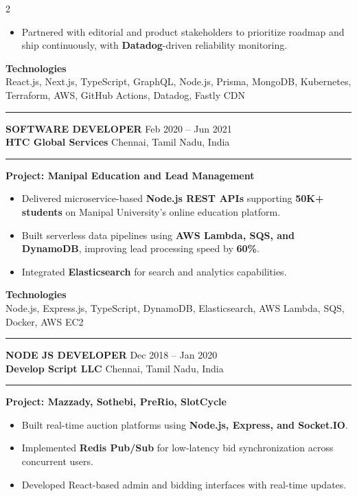 \documentclass[10pt,a4paper]{article}
\newcommand{\blockdivider}{\vspace{0pt}\color{rulecolor}\rule{\linewidth}{0.5pt}\color{primary}\vspace{4pt}}
\newcommand{\roleheader}[4]{%
  \noindent
  \textbf{\MakeUppercase{#3}}%
  \hfill
  \textcolor{secondary}{#4}\\[0pt]

  \noindent
  \textbf{#1}%
  \hfill
  \textcolor{secondary}{#2}\\[0pt]
}
\newcommand{\roledivider}{%
  \vspace{-1pt}%
  {\color{rulecolor}\rule{\linewidth}{0.5pt}}%
  \vspace{2pt}%
}
\newcommand{\projecttitle}[1]{\textbf{#1}\par\vspace{2pt}}
\begin{document}
\begin{paracol}{2}
\begin{itemize}
\item Partnered with editorial and product stakeholders to prioritize roadmap and ship continuously, with \textbf{Datadog}-driven reliability monitoring.

\end{itemize}

\textbf{Technologies}\\
React.js, Next.js, TypeScript, GraphQL, Node.js, Prisma, MongoDB, Kubernetes, Terraform, AWS, GitHub Actions, Datadog, Fastly CDN

\blockdivider

\roleheader{HTC Global Services}{Chennai, Tamil Nadu, India}{Software Developer}{Feb 2020 -- Jun 2021}
\roledivider

\projecttitle{Project: Manipal Education and Lead Management}
\begin{itemize}

\item Delivered microservice-based \textbf{Node.js REST APIs} supporting \textbf{50K+ students} on Manipal University's online education platform.

\item Built serverless data pipelines using \textbf{AWS Lambda, SQS, and DynamoDB}, improving lead processing speed by \textbf{60\%}.

\item Integrated \textbf{Elasticsearch} for search and analytics capabilities.

\end{itemize}

\textbf{Technologies}\\
Node.js, Express.js, TypeScript, DynamoDB, Elasticsearch, AWS Lambda, SQS, Docker, AWS EC2

\blockdivider

\roleheader{Develop Script LLC}{Chennai, Tamil Nadu, India}{Node JS Developer}{Dec 2018 -- Jan 2020}
\roledivider

\projecttitle{Project: Mazzady, Sothebi, PreRio, SlotCycle}
\begin{itemize}

\item Built real-time auction platforms using \textbf{Node.js, Express, and Socket.IO}.

\item Implemented \textbf{Redis Pub/Sub} for low-latency bid synchronization across concurrent users.

\item Developed React-based admin and bidding interfaces with real-time updates.


\end{itemize}
\end{paracol}
\end{document}

